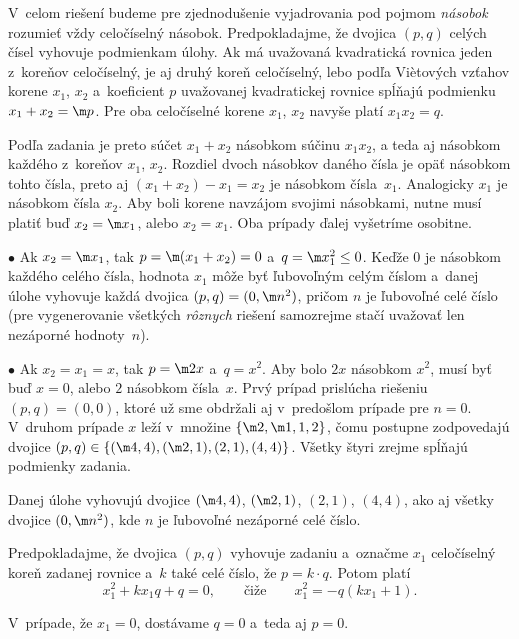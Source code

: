 {%
V~celom riešení budeme pre zjednodušenie vyjadrovania pod pojmom {\it násobok\/} rozumieť vždy celočíselný násobok.
Predpokladajme, že dvojica $(p,q)$ celých čísel vyhovuje podmienkam úlohy. Ak má uvažovaná kvadratická rovnica
jeden z~koreňov celočíselný, je aj druhý koreň celočíselný, lebo podľa Vi\`etových vzťahov korene $x_1$, $x_2$ a~koeficient $p$ uvažovanej kvadratickej rovnice spĺňajú podmienku $x_1+x_2=\m p$. Pre oba celočíselné korene $x_1$, $x_2$ navyše platí $x_1x_2=q$.

Podľa zadania je preto súčet $x_1+x_2$ násobkom súčinu $x_1x_2$, a teda aj násobkom každého z~koreňov $x_1$, $x_2$. Rozdiel dvoch násobkov daného čísla je opäť násobkom tohto čísla, preto aj $(x_1+x_2)-x_1=x_2$ je násobkom čísla~$x_1$. Analogicky $x_1$ je násobkom čísla $x_2$. Aby boli korene navzájom svojimi násobkami, nutne musí platiť buď $x_2=\m x_1$, alebo $x_2=x_1$. Oba prípady ďalej vyšetríme osobitne.

\item{$\bullet$} Ak $x_2=\m x_1$, tak $p=\m(x_1+x_2)=0$ a~$q=\m x_1^2\le 0$. Keďže $0$ je násobkom každého celého čísla, hodnota $x_1$ môže byť ľubovoľným celým číslom a~danej úlohe vyhovuje každá dvojica $(p,q)=(0,\m n^2)$, pričom $n$ je ľubovoľné celé číslo (pre vygenerovanie všetkých {\it rôznych\/} riešení samozrejme stačí uvažovať len nezáporné hodnoty~$n$).
\item{$\bullet$} Ak $x_2=x_1=x$, tak $p=\m2x$ a~$q=x^2$. Aby bolo $2x$ násobkom $x^2$, musí byť buď $x=0$, alebo $2$ násobkom čísla~$x$. Prvý prípad prislúcha riešeniu $(p,q)=(0,0)$, ktoré už sme obdržali aj v~predošlom prípade pre $n=0$. V~druhom prípade $x$ leží v~množine $\{\m2,\m1,1,2\}$, čomu postupne zodpovedajú dvojice $(p,q)\in \{(\m4,4),(\m2,1),(2,1),(4,4)\}$. Všetky štyri zrejme spĺňajú podmienky zadania.

\odpoved
Danej úlohe vyhovujú dvojice $(\m4,4)$, $(\m2,1)$, $(2,1)$, $(4,4)$, ako aj všetky dvojice $(0,\m n^2)$, kde $n$ je ľubovoľné nezáporné celé číslo.

\ineriesenie
Predpokladajme, že dvojica $(p,q)$ vyhovuje zadaniu a~označme $x_1$ celočíselný koreň zadanej rovnice a~$k$ také celé číslo, že $p=k\cdot q$. Potom platí
$$
x_1^2+kx_1q+q=0,\qquad\text{čiže}\qquad x_1^2=-q(kx_1+1).
$$

V~prípade, že $x_1=0$, dostávame $q=0$ a~teda aj $p=0$.

}
